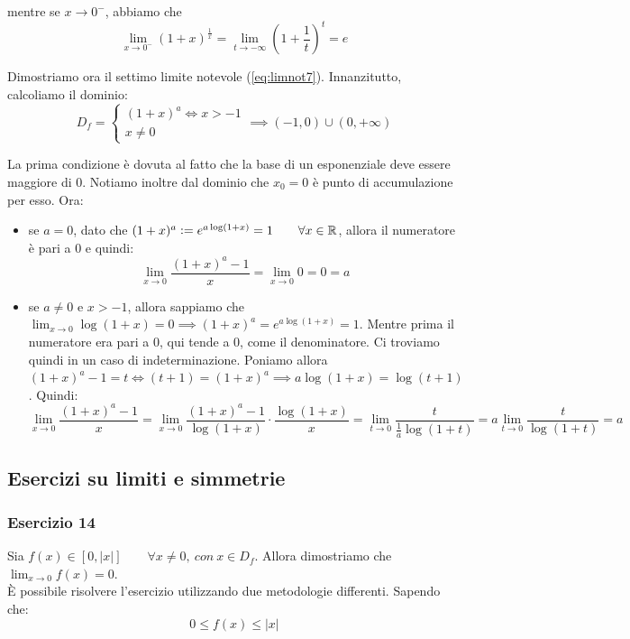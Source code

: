 \documentclass{article}
\begin{document}
\noindent mentre se $x \to 0^-$, abbiamo che
\begin{equation*}
    \lim_{x \to 0^-} (1 + x)^\frac{1}{x} = \lim_{t \to -\infty} \left(1 + \frac{1}{t}\right)^t = e
\end{equation*}

\noindent Dimostriamo ora il settimo limite notevole (\ref{eq:limnot7}). Innanzitutto, calcoliamo il dominio: 
\begin{equation*}
    D_f = 
    \begin{cases}
        (1 + x)^a \iff x > -1 \\
        x \neq 0
    \end{cases}
    \implies (-1, 0) \cup (0, +\infty)
\end{equation*}

\noindent La prima condizione è dovuta al fatto che la base di un esponenziale deve essere maggiore di $0$. Notiamo inoltre dal dominio che $x_0 = 0$ è punto di accumulazione per esso. Ora:
\begin{itemize}
    \item se $a = 0$, dato che $(1 + x)^a \vcentcolon = e^{a\log(1 + x)} = 1 \qquad \forall x \in \mathbb{R}$, allora il numeratore è pari a $0$ e quindi: $$\lim_{x \to 0} \frac{(1 + x)^a - 1}{x} = \lim_{x \to 0} 0 = 0 = a$$
    \item se $a \neq 0$ e $x > -1$, allora sappiamo che $\lim_{x \to 0} \log(1 + x) = 0 \implies (1 + x)^a = e^{a\log(1 + x)} = 1$. Mentre prima il numeratore era pari a $0$, qui tende a $0$, come il denominatore. Ci troviamo quindi in un caso di indeterminazione. Poniamo allora $(1 + x)^a - 1 = t \iff (t + 1) = (1 + x)^a \implies a\log(1 + x) = \log(t + 1)$. Quindi: $$\lim_{x \to 0} \frac{(1 + x)^a - 1}{x} = \lim_{x \to 0} \frac{(1 + x)^a - 1}{\log(1 + x)} \cdot \frac{\log(1 + x)}{x} = \lim_{t \to 0} \frac{t}{\frac{1}{a} \log(1 + t)} = a\lim_{t \to 0}\frac{t}{\log(1 + t)} = a$$
\end{itemize}

\subsection{Esercizi su limiti e simmetrie}
\subsubsection{Esercizio 14}
Sia $f(x) \in [0, |x|] \qquad \forall x \neq 0, \ con \ x \in D_f$. Allora dimostriamo che $\lim_{x \to 0} f(x) = 0$.\\
È possibile risolvere l'esercizio utilizzando due metodologie differenti. Sapendo che:
\begin{equation*}
    0 \leq f(x) \leq |x|
\end{equation*}
\end{document}
